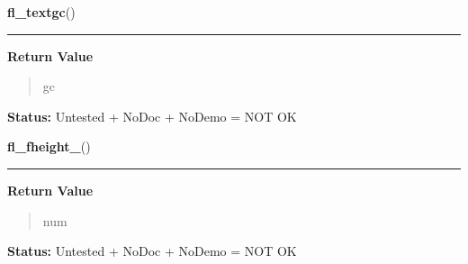     \label{xformslib:library:fl_textgc_}

    \vspace{0.5ex}

\hspace{.8\funcindent}\begin{boxedminipage}{\funcwidth}

    \raggedright \textbf{fl\_textgc}()

    \vspace{-1.5ex}

    \rule{\textwidth}{0.5\fboxrule}
\setlength{\parskip}{2ex}
\setlength{\parskip}{1ex}
      \textbf{Return Value}
    \vspace{-1ex}

      \begin{quote}
      gc

      \end{quote}

\textbf{Status:} Untested + NoDoc + NoDemo = NOT OK



    \end{boxedminipage}

    \label{xformslib:library:fl_fheight_}

    \vspace{0.5ex}

\hspace{.8\funcindent}\begin{boxedminipage}{\funcwidth}

    \raggedright \textbf{fl\_fheight\_}()

    \vspace{-1.5ex}

    \rule{\textwidth}{0.5\fboxrule}
\setlength{\parskip}{2ex}
\setlength{\parskip}{1ex}
      \textbf{Return Value}
    \vspace{-1ex}

      \begin{quote}
      num

      \end{quote}

\textbf{Status:} Untested + NoDoc + NoDemo = NOT OK



    \end{boxedminipage}

